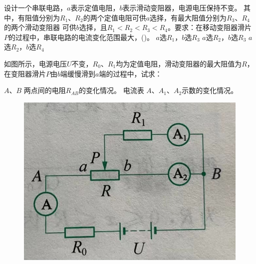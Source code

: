 \documentclass[a4paper,cs4size]{BHCexam}
\begin{document}
\begin{groups}
\begin{questions}[]
        \question[5] 设计一个串联电路，$a$表示定值电阻，$b$表示滑动变阻器，电源电压保持不变。
        其中，有阻值分别为$R_1$、$R_2$的两个定值电阻可供$a$选择，有最大阻值分别为$R_3$、$R_4$的两个滑动变阻器
        可供$b$选择，且$R_1<R_2<R_3<R_4$。要求：在移动变阻器滑片$P$的过程中，串联电路的电流变化范围最大，(\quad\quad\quad)。
        {$a$选$R_1$，$b$选$R_3$}
        {$a$选$R_2$，$b$选$R_3$}
        {$a$选$R_2$，$b$选$R_4$}
        \vspace{2.5cm}

        \newpage
        
        \question[5] 如图所示，电源电压$U$不变，$R_0$、$R_1$均为定值电阻，滑动变阻器的最大阻值为$R$，
        在变阻器滑片$P$由$b$端缓慢滑到$a$端的过程中，试求：
        \begin{subquestions}
            \subquestion $A$、$B$ 两点间的电阻$R_{AB}$的变化情况。
            \subquestion 电流表 $A$、$A_1$、$A_2$示数的变化情况。
        \end{subquestions}
        \begin{figure}[htb]
            \flushright
            \includegraphics [scale=0.4,trim=0 0 0 0]{./image/physics_circuit3_10.png}
            \label{fig:fig_circuit3_10}
        \end{figure}







    \end{questions}





\end{groups}


\label{lastpage}
\end{document}

